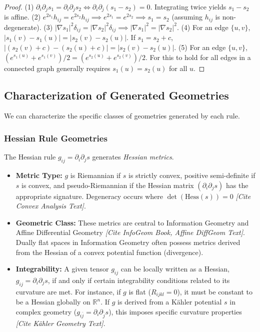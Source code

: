 \documentclass[twoside,twocolumn]{article}
\begin{document}
\begin{proof} %
(1) \( \partial_i \partial_j s_1 = \partial_i \partial_j s_2 \iff \partial_i \partial_j (s_1 - s_2) = 0 \). Integrating twice yields \( s_1-s_2 \) is affine.
(2) \( e^{2s_1} h_{ij} = e^{2s_2} h_{ij} \implies e^{2s_1}=e^{2s_2} \implies s_1=s_2 \) (assuming \( h_{ij} \) is non-degenerate).
(3) \( |\nabla s_1|^2 \delta_{ij} = |\nabla s_2|^2 \delta_{ij} \implies |\nabla s_1|^2 = |\nabla s_2|^2 \).
(4) For an edge \( \{u, v\} \), \( |s_1(v)-s_1(u)| = |s_2(v)-s_2(u)| \). If \( s_1 = s_2 + c \), \( |(s_2(v)+c)-(s_2(u)+c)| = |s_2(v)-s_2(u)| \).
(5) For an edge \( \{u, v\} \), \( (e^{s_1(u)}+e^{s_1(v)})/2 = (e^{s_2(u)}+e^{s_2(v)})/2 \). For this to hold for all edges in a connected graph generally requires \( s_1(u) = s_2(u) \) for all \( u \).
\end{proof}

\subsection{Characterization of Generated Geometries}

We can characterize the specific classes of geometries generated by each rule.

\subsubsection{Hessian Rule Geometries}
The Hessian rule \( g_{ij} = \partial_i \partial_j s \) generates \emph{Hessian metrics}.
\begin{itemize}
    \item \textbf{Metric Type:} \( g \) is Riemannian if \( s \) is strictly convex, positive semi-definite if \( s \) is convex, and pseudo-Riemannian if the Hessian matrix \( (\partial_i \partial_j s) \) has the appropriate signature. Degeneracy occurs where \( \det(\text{Hess}(s)) = 0 \) \textit{[Cite Convex Analysis Text]}.
    \item \textbf{Geometric Class:} These metrics are central to Information Geometry and Affine Differential Geometry \textit{[Cite InfoGeom Book, Affine DiffGeom Text]}. Dually flat spaces in Information Geometry often possess metrics derived from the Hessian of a convex potential function (divergence).
    \item \textbf{Integrability:} A given tensor \( g_{ij} \) can be locally written as a Hessian, \( g_{ij}=\partial_i\partial_j s \), if and only if certain integrability conditions related to its curvature are met. For instance, if \( g \) is flat (\( R_{ijkl}=0 \)), it must be constant to be a Hessian globally on \( \mathbb{R}^n \). If \( g \) is derived from a Kähler potential \( s \) in complex geometry (\( g_{i\bar{j}} = \partial_i \partial_{\bar{j}} s \)), this imposes specific curvature properties \textit{[Cite Kähler Geometry Text]}.
\end{itemize}
\end{document}
